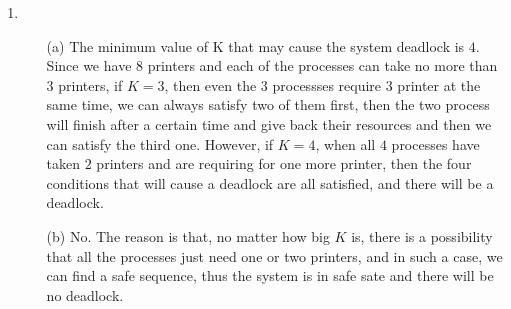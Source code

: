 \documentclass[12pt,a4paper]{article}
\begin{document}
	\begin{enumerate}
		\item 
			\begin{itemize}
				\item[(a)] The minimum value of K that may cause the system deadlock is $4$. Since we have $8$ printers and each of the processes can take no more than $3$ printers, if $K=3$, then even the $3$ processses require $3$ printer at the same time, we can always satisfy two of them first, then the two process will finish after a certain time and give back their resources and then we can satisfy the third one. However, if $K=4$, when all $4$ processes have taken $2$ printers and are requiring for one more printer, then the four conditions that will cause a deadlock are all satisfied, and there will be a deadlock.
				
				\item[(b)] No. The reason is that, no matter how big $K$ is, there is a possibility that all the processes just need one or two printers, and in such a case, we can find a safe sequence, thus the system is in safe sate and there will be no deadlock. 
			\end{itemize}
		

\end{enumerate}
\end{document}
